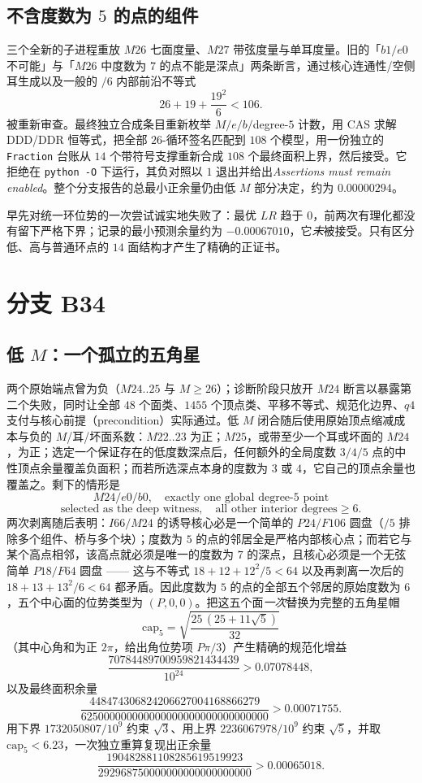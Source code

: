 \subsection{不含度数为 $5$ 的点的组件}

三个全新的子进程重放 $M26$ 七面度量、$M27$ 带弦度量与单耳度量。旧的「$b1/e0$ 不可能」与「$M26$ 中度数为 $7$ 的点不能是深点」两条断言，通过核心连通性/空侧耳生成以及一般的 $/6$ 内部前沿不等式
\[
26+19+\frac{19^2}{6}<106 .
\]
被重新审查。最终独立合成条目重新枚举 $M/e/b/$degree-$5$ 计数，用 CAS 求解 DDD/DDR 恒等式，把全部 $26$-循环签名匹配到 $108$ 个模型，用一份独立的 \texttt{Fraction} 台账从 $14$ 个带符号支撑重新合成 $108$ 个最终面积上界，然后接受。它拒绝在 \texttt{python -\allowbreak{}O} 下运行，其负对照以 $1$ 退出并给出\emph{Assertions must remain enabled}。整个分支报告的总最小正余量仍由低 $M$ 部分决定，约为 $0.00000294$。

早先对统一环位势的一次尝试诚实地失败了：最优 $LR$ 趋于 $0$，前两次有理化都没有留下严格下界；记录的最小预测余量约为 $-0.00067010$，它\emph{未}被接受。只有区分低、高与普通环点的 $14$ 面结构才产生了精确的正证书。

\section{分支 B34}

\subsection{低 $M$：一个孤立的五角星}

两个原始端点曾为负（$M24..25$ 与 $M\ge26$）；诊断阶段只放开 $M24$ 断言以暴露第二个失败，同时让全部 $48$ 个面类、$1455$ 个顶点类、平移不等式、规范化边界、$q4$ 支付与核心前提（precondition）实际通过。低 $M$ 闭合随后使用原始顶点缩减成本与负的 $M$/耳/坏面系数：$M22..23$ 为正；$M25$，或带至少一个耳或坏面的 $M24$，为正；选定一个保证存在的低度数深点后，任何额外的全局度数 $3/4/5$ 点的中性顶点余量覆盖负面积；而若所选深点本身的度数为 $3$ 或 $4$，它自己的顶点余量也覆盖之。剩下的情形是
\[
M24/e0/b0,\quad\text{exactly one global degree-}5\text{ point}
\]
\[
\text{selected as the deep witness},\quad\text{all other interior degrees}\ge6 .
\]
两次剥离随后表明：$I66/M24$ 的诱导核心必是一个简单的 $P24/F106$ 圆盘（$/5$ 排除多个组件、桥与多个块）；度数为 $5$ 的点的邻居全是严格内部核心点；而若它与某个高点相邻，该高点就必须是唯一的度数为 $7$ 的深点，且核心必须是一个无弦简单 $P18/F64$ 圆盘 —— 这与不等式 $18+12+12^2/5<64$ 以及再剥离一次后的 $18+13+13^2/6<64$ 都矛盾。因此度数为 $5$ 的点的全部五个邻居的原始度数为 $6$，五个中心面的位势类型为 $(P,0,0)$。把这五个面\emph{一次}替换为完整的五角星帽
\[
\mathrm{cap}_5=\sqrt{\frac{25\,(25+11\sqrt5)}{32}}
\]
（其中心角和为正 $2\pi$，给出角位势项 $P\pi/3$）产生精确的规范化增益
\[
\frac{70784489700959821434439}{10^{24}}>0.07078448,
\]
以及最终面积余量
\[
\frac{448474306824206627004168866279}{625000000000000000000000000000000}>0.00071755 .
\]
用下界 $1732050807/10^9$ 约束 $\sqrt3$、用上界 $2236067978/10^9$ 约束 $\sqrt5$，并取 $\mathrm{cap}_5<6.23$，一次独立重算复现出正余量
\[
\frac{190482881108285619519923}{292968750000000000000000000}>0.00065018 .
\]

